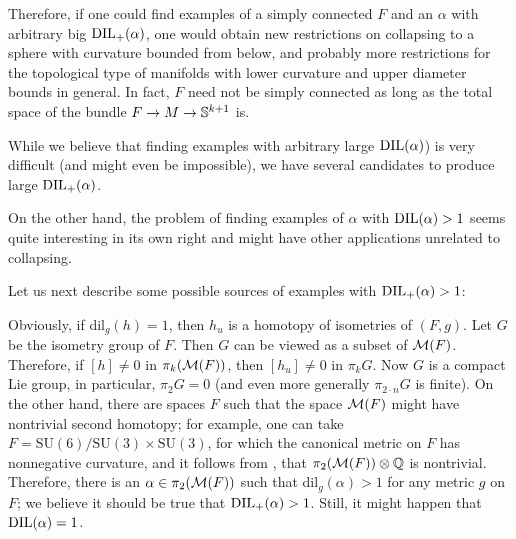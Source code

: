 \documentclass{amsart}
\begin{document}
Therefore, if one could find examples of a simply connected $F$ and an $\alpha$ with arbitrary big $\operatorname{\rm DIL}_+(\alpha)$, one would obtain new restrictions on collapsing to a sphere with curvature bounded from below, and probably more restrictions for the topological type of manifolds with lower curvature and upper diameter bounds in general.
In fact, $F$ need not be simply connected as long as the total space of the bundle $F\to M\to {\Bbb S}^{k+1}$ is.

While we believe that finding examples with arbitrary large  $\operatorname{\rm DIL}(\alpha)$) is very difficult
(and might even be impossible), we have several candidates to produce large $\operatorname{\rm DIL}_+(\alpha)$.

On the other hand, the problem of finding examples of $\alpha$ with
$\operatorname{\rm DIL}(\alpha)>1$
seems quite interesting in its own right and might have other applications unrelated to collapsing.

\medskip

Let us next describe  some possible sources of  examples with
$\operatorname{\rm DIL}_+(\alpha)>1$:

\begin{ex}
Obviously, if dil$_g(h)=1$, then $h_u$ is a homotopy of isometries of $(F,g)$.
Let $G$ be the isometry group of $F$.
Then $G$ can be viewed as a subset of ${\mathcal M}(F)$.
Therefore, if $[h]\not= 0$ in $\pi_k({\mathcal M}(F))$, then $[h_u]\not=0$ in $\pi_kG$.
Now $G$ is a compact Lie group, in particular, $\pi_2G=0$
(and even more generally $\pi_{2\cdot n}G$ is finite).
On the other hand, there are spaces $F$ such that the space ${\mathcal M}(F)$ might have nontrivial second homotopy;
for example, one can take  $F=\mathrm{SU}(6)/\mathrm{SU}(3)\times \mathrm{SU}(3)$,
for which the canonical metric on $F$ has nonnegative curvature,
and it follows
from  \cite[Chapter 5, Example 4.14]{OT},
that
$\pi_2({\mathcal M}(F))\otimes {\Bbb Q}$ is nontrivial.
Therefore, there is  an $\alpha \in \pi_2({\mathcal M}(F))$ such that
dil$_g(\alpha)>1$ for any metric $g $ on $F$;
we believe it should be true that $\operatorname{\rm DIL}_+(\alpha)>1$.
Still, it might happen that $\operatorname{\rm DIL}(\alpha)=1$.
\end{ex}
\end{document}
